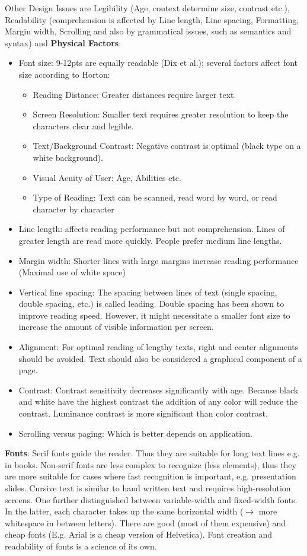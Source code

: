 Other Design Issues are Legibility (Age, context determine size, contrast etc.), Readability (comprehension is affected by Line length, Line spacing, Formatting, Margin width, Scrolling and also by grammatical issues, such as semantics and syntax) and \textbf{Physical Factors}:
\begin{itemize}
\item Font size: 9-12pts are equally readable (Dix et al.); several factors affect font size according to Horton:
\begin{itemize}
\item Reading Distance: Greater distances require larger text.
\item Screen Resolution: Smaller text requires greater resolution to keep the characters clear and legible.
\item Text/Background Contrast: Negative contrast is optimal (black type on a white background).
\item Visual Acuity of User: Age, Abilities etc.
\item Type of Reading: Text can be scanned, read word by word, or read character by character
\end{itemize}
\item Line length: affects reading performance but not comprehension. Lines of greater length are read more quickly. People prefer medium line lengths.
\item Margin width: Shorter lines with large margins increase reading performance (Maximal use of white space)
\item Vertical line spacing: The spacing between lines of text (single spacing, double spacing, etc.) is called leading. Double spacing has been shown to improve reading speed. However, it might necessitate a smaller font size to increase the amount of visible information per screen.
\item Alignment: For optimal reading of lengthy texts, right and center alignments should be avoided. Text should also be considered a graphical component of a page.
\item Contrast: Contrast sensitivity decreases significantly with age. Because black and white have the highest contrast the addition of any color will reduce the contrast. Luminance contrast is more significant than color contrast.
\item Scrolling versus paging: Which is better depends on application.
\end{itemize}
\textbf{Fonts}: Serif fonts guide the reader. Thus they are suitable for long text lines e.g. in books. Non-serif fonts are less complex to recognize (less elements), thus they are more suitable for cases where fast recognition is important, e.g. presentation slides. Cursive text is similar to hand written text and requires high-resolution screens. One further distinguished between variable-width and fixed-width fonts. In the latter, each character takes up the same horizontal width ($\rightarrow$ more whitespace in between letters).
There are good (most of them expensive) and cheap fonts (E.g. Arial is a cheap version of Helvetica). Font creation and readability of fonts is a science of its own.

